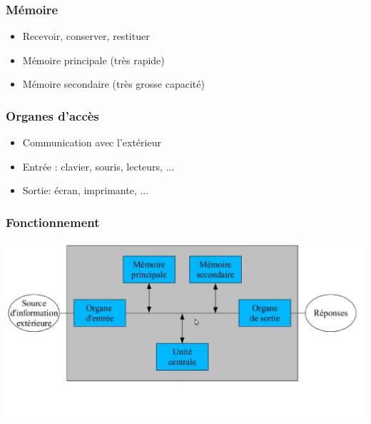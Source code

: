 			\subsubsection{Mémoire}
				\begin{itemize}
					\item[\textbullet] Recevoir, conserver, restituer
					\item[\textbullet] Mémoire principale (très rapide)
					\item[\textbullet] Mémoire secondaire (très grosse capacité)
				\end{itemize}
			\subsubsection{Organes d'accès}
				\begin{itemize}
					\item[\textbullet] Communication avec l'extérieur
					\item[\textbullet] Entrée : clavier, souris, lecteurs, ...
					\item[\textbullet] Sortie: écran, imprimante, ...
				\end{itemize}
			\subsubsection{Fonctionnement}
				\includegraphics[width=445pt]{fonctionnement_ordi.eps}
